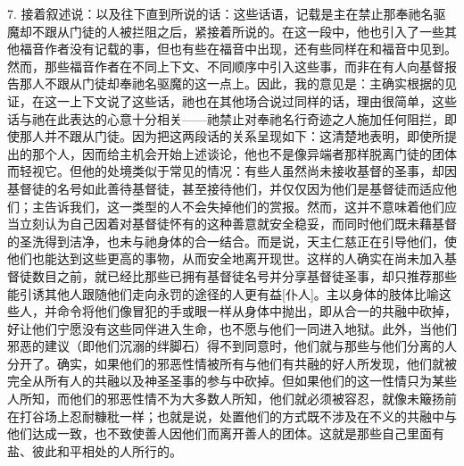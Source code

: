 7. 接着叙述说：以及往下直到所说的话：这些话语，记载是主在禁止那奉祂名驱魔却不跟从门徒的人被拦阻之后，紧接着所说的。在这一段中，他也引入了一些其他福音作者没有记载的事，但也有些在福音中出现，还有些同样在和福音中见到。然而，那些福音作者在不同上下文、不同顺序中引入这些事，而非在有人向基督报告那人不跟从门徒却奉祂名驱魔的这一点上。因此，我的意见是：主确实根据的见证，在这一上下文说了这些话，祂也在其他场合说过同样的话，理由很简单，这些话与祂在此表达的心意十分相关——祂禁止对奉祂名行奇迹之人施加任何阻拦，即使那人并不跟从门徒。因为把这两段话的关系呈现如下：这清楚地表明，即使所提出的那个人，因而给主机会开始上述谈论，他也不是像异端者那样脱离门徒的团体而轻视它。但他的处境类似于常见的情况：有些人虽然尚未接收基督的圣事，却因基督徒的名号如此善待基督徒，甚至接待他们，并仅仅因为他们是基督徒而适应他们；主告诉我们，这一类型的人不会失掉他们的赏报。然而，这并不意味着他们应当立刻认为自己因着对基督徒怀有的这种善意就安全稳妥，而同时他们既未藉基督的圣洗得到洁净，也未与祂身体的合一结合。而是说，天主仁慈正在引导他们，使他们也能达到这些更高的事物，从而安全地离开现世。这样的人确实在尚未加入基督徒数目之前，就已经比那些已拥有基督徒名号并分享基督徒圣事，却只推荐那些能引诱其他人跟随他们走向永罚的途径的人更有益[仆人]。主以身体的肢体比喻这些人，并命令将他们像冒犯的手或眼一样从身体中抛出，即从合一的共融中砍掉，好让他们宁愿没有这些同伴进入生命，也不愿与他们一同进入地狱。此外，当他们邪恶的建议（即他们沉溺的绊脚石）得不到同意时，他们就与那些与他们分离的人分开了。确实，如果他们的邪恶性情被所有与他们有共融的好人所发现，他们就被完全从所有人的共融以及神圣圣事的参与中砍掉。但如果他们的这一性情只为某些人所知，而他们的邪恶性情不为大多数人所知，他们就必须被容忍，就像未簸扬前在打谷场上忍耐糠秕一样；也就是说，处置他们的方式既不涉及在不义的共融中与他们达成一致，也不致使善人因他们而离开善人的团体。这就是那些自己里面有盐、彼此和平相处的人所行的。\par



